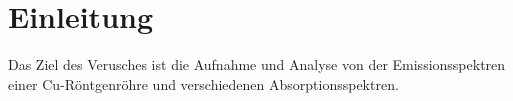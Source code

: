 \section{Einleitung}
Das Ziel des Verusches ist die Aufnahme und Analyse von der Emissionsspektren einer Cu-Röntgenröhre und verschiedenen Absorptionsspektren.

\label{sec:Einleitung}